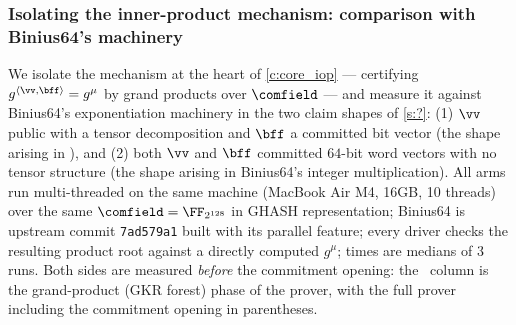 %
%

\subsubsection{Isolating the inner-product mechanism: comparison with Binius64's machinery}\label{s:exp_binius64_ip}

We isolate the mechanism at the heart of \cref{c:core_iop} --- certifying $g^{\langle \vv, \bff\rangle} = g^{\mu}$ by grand products over $\comfield$ --- and measure it against Binius64's exponentiation machinery \cite{binius64} in the two claim shapes of \cref{s:?}: 
(1) $\vv$ public with a tensor decomposition and $\bff$ a committed bit vector (the shape arising in \ftwoz), and (2) both $\vv$ and $\bff$ committed $64$-bit word vectors with no tensor structure (the shape arising in Binius64's integer multiplication). All arms run multi-threaded on the same machine (MacBook Air M4, 16GB, 10 threads) over the same $\comfield=\FF_{2^{128}}$ in GHASH representation; Binius64 is upstream commit \texttt{7ad579a1} built with its parallel feature; every driver checks the resulting product root against a directly computed $g^{\mu}$; times are medians of $3$ runs. Both sides are measured \emph{before} the commitment opening: the \ftwoz\ column is the grand-product (GKR forest) phase of the prover, with the full prover including the commitment opening in parentheses.

